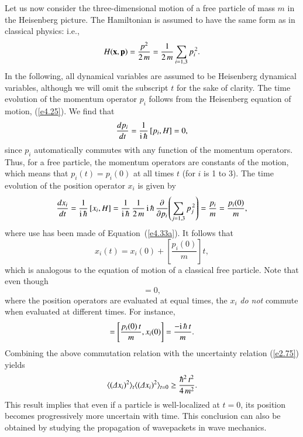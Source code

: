 Let us now consider the three-dimensional motion of a free particle of mass
$m$ in the
Heisenberg picture. The Hamiltonian is assumed to have the same form as in
classical physics: i.e., 
\begin{equation}
H({\bf x},{\bf p}) = \frac{{p}^2}{2\,m} = \frac{1}{2\,m} \sum_{i=1,3} p_i^{\,2}.
\end{equation}
In the following, all dynamical variables are assumed to be Heisenberg dynamical
variables, although we will omit the subscript $t$ for the sake of clarity. 
The time evolution of the momentum operator $p_i$ follows from the Heisenberg 
equation of motion, (\ref{e4.25}). We find that
\begin{equation}
\frac{dp_i}{dt} = \frac{1}{{\rm i}\,\hbar}\,[p_i, H] = 0,
\end{equation}
since $p_i$ automatically commutes with any function of the momentum operators. 
Thus, for a free particle, the momentum operators are constants of the motion,
which means that $p_i(t) = p_i(0)$ at all times $t$ (for $i$ is 1 to 3). 
The time evolution of the position operator $x_i$ is given by
\begin{equation}
\frac{d x_i}{dt} = \frac{1}{{\rm i}\,\hbar}\, [x_i, H] = \frac{1}{{\rm i}\,\hbar}\,
\frac{1}{2\,m}\, {\rm i}\,\hbar\,\frac{\partial}{\partial p_i}\!
\left(\sum_{j=1,3} p_j^{\,2}\right) = \frac{p_i}{m} = \frac{p_i(0)}{m},
\end{equation}
where use has been made of Equation~(\ref{e4.33a}).  It follows that
\begin{equation}
x_i(t) = x_i(0) + \left[\frac{p_i(0)}{m}\right] t,
\end{equation}
which is analogous to the equation of motion of a classical free particle.
Note that even though
\begin{equation}
[x_i(0), x_j(0)] = 0,
\end{equation}
where the position operators are evaluated at equal times, the $x_i$ {\em do not}
commute when evaluated at different times. For instance,
\begin{equation}
[x_i(t), x_i(0)] = \left[ \frac{p_i(0)\,t}{m}, x_i(0)\right] = 
\frac{-{\rm i}\,\hbar \,t}
{m}.
\end{equation}
Combining the above commutation relation with the uncertainty relation (\ref{e2.75}) yields
\begin{equation}
\langle ({\mit\Delta} x_i)^2\rangle_t \langle ({\mit\Delta} x_i)^2\rangle_{t=0} \geq
\frac{\hbar^2\, t^2}{4\, m^2}.
\end{equation}
This result implies that even if a particle is well-localized at $t=0$, its
position becomes progressively more uncertain with time. This conclusion
can also be obtained by studying the propagation of wavepackets in
wave mechanics.

